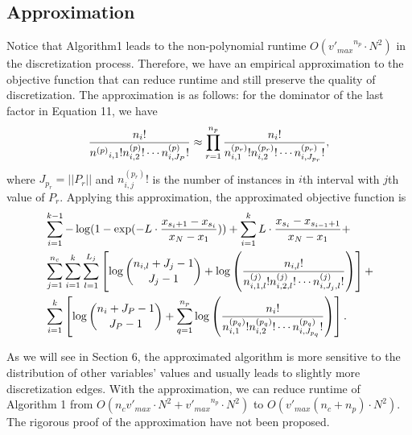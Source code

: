 {\subsection{Approximation}
\label{approx}
Notice that Algorithm1 leads to the non-polynomial runtime $O({v'_{max}}^{n_p} \cdot N^2)$ in the discretization process. Therefore, we have an empirical approximation to the objective function that can reduce runtime and still preserve the quality of discretization. The approximation is as follows: for the dominator of the last factor in Equation 11, we have
\begin{equation}
{{{{n}_i}!}\over{ {{n^{(p)}}_{i,1} !} {n^{(p)}_{i,2} !} \cdots {n^{(p)}_{i,J_P} !}}} \approx \prod_{r=1}^{n_p} { {{{n}_i}!}\over{ {n^{(p_r)}_{i,1} !} {n^{(p_r)}_{i,2} !} \cdots {n^{(p_r)}_{i,J_{p_r}} !}}},
\end{equation}
where $J_{p_r} = || P_r||$ and ${n^{(p_r)}_{i,j} !}$ is the number of instances in $i$th interval with $j$th value of $P_r$. Applying this approximation, the approximated objective function is
\begin{equation}
\begin{aligned}
& \sum_{i=1}^{k-1} - \log(1 - {\exp(- L \cdot {{x_{s_i+1} - x_{s_i}}\over{x_N - x_1}})}) +  \sum_{i=1}^{k} L \cdot {{x_{s_{i}} - x_{s_{i-1} + 1}}\over{x_N - x_1}} +\\
&  \sum_{j=1}^{n_c} \sum_{i=1}^{k}  \sum_{l=1}^{L_j} \left[  \log{{n_{i,l} + J_j - 1}\choose{J_j-1}} + \log \left( { {{n_{i,l}}!}\over{ {n^{(j)}_{i,1,l} !} {n^{(j)}_{i,2,l} !} \cdots {n^{(j)}_{i,J_j,l} !}} } \right) \right] + \\
& \sum_{i=1}^k \left[  \log {{n_{i} + J_P - 1}\choose{J_P-1}} + \sum_{q=1}^{n_p} \log \left( { {{{n}_i}!}\over{ {n^{(p_q)}_{i,1} !} {n^{(p_q)}_{i,2} !} \cdots {n^{(p_q)}_{i,J_{p_q}} !}}} \right) \right].
\end{aligned}
\end{equation}


As we will see in Section 6, the approximated algorithm is more sensitive to the distribution of other variables' values and usually leads to slightly more discretization edges. With the approximation, we can reduce runtime of Algorithm 1 from $O(n_c  {v'_{max}} \cdot N^2 + {v'_{max}}^{n_p} \cdot N^2)$ to $O( {v'_{max}} (n_c + n_p) \cdot N^2)$. The rigorous proof of the approximation have not been proposed.

}
